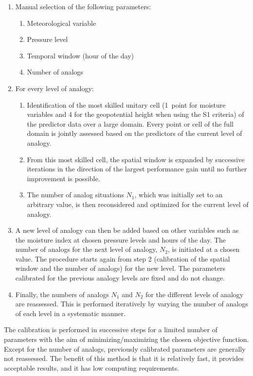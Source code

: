 \documentclass[gmd]{copernicus}
\begin{document}
\begin{enumerate}
	\item Manual selection of the following parameters:
	\begin{enumerate}
		\item Meteorological variable
		\item Pressure level
		\item Temporal window (hour of the day)
		\item Number of analogs 
	\end{enumerate}
	
	\item For every level of analogy:
	\begin{enumerate}
		\item Identification of the most skilled unitary cell (1~point for moisture variables and 4 for the geopotential height when using the S1 criteria) of the predictor data over a large domain. Every point or cell of the full domain is jointly assessed based on the predictors of the current level of analogy.
		\item From this most skilled cell, the spatial window is expanded by successive iterations in the direction of the largest performance gain until no further improvement is possible.
		\item The number of analog situations $N_{1}$, which was initially set to an arbitrary value, is then reconsidered and optimized for the current level of analogy.
	\end{enumerate}
	\item A new level of analogy can then be added based on other variables such as the moisture index at chosen pressure levels and hours of the day. The number of analogs for the next level of analogy, $N_{2}$, is initiated at a chosen value. The procedure starts again from step 2 (calibration of the spatial window and the number of analogs) for the new level. The parameters calibrated for the previous analogy levels are fixed and do not change.
	\item Finally, the numbers of analogs $N_{1}$ and $N_{2}$ for the different levels of analogy are reassessed. This is performed iteratively by varying the number of analogs of each level in a systematic manner. 
\end{enumerate}

The calibration is performed in successive steps for a limited number of parameters with the aim of minimizing/maximizing the chosen objective function. Except for the number of analogs, previously calibrated parameters are generally not reassessed. The benefit of this method is that it is relatively fast, it provides acceptable results, and it has low computing requirements. 
\end{document}
